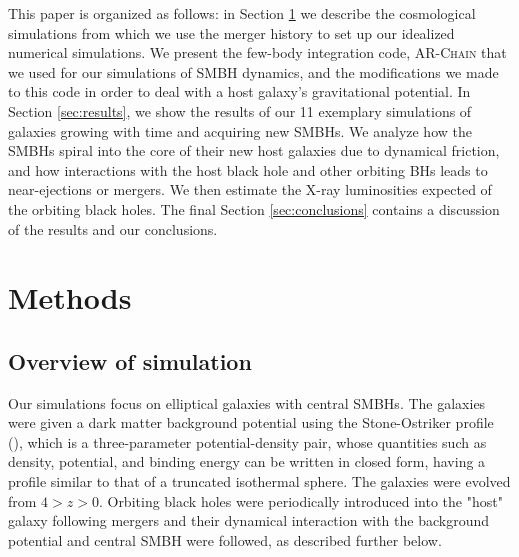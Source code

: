 \documentclass[english, backref,breaklinks,colorlinks,citecolor=blue, usenatbib]{mnras}
\begin{document}
This paper is organized as follows: in Section \ref{sec:methods} we describe the cosmological simulations from which we use the merger history to set up our idealized numerical simulations. We present the few-body integration code, \textsc{AR-Chain} that we used for our simulations of SMBH dynamics, and the modifications we made to this code in order to deal with a host galaxy's gravitational potential. In Section \ref{sec:results}, we show the results of our 11 exemplary simulations of galaxies growing with time and acquiring new SMBHs. We analyze how the SMBHs spiral into the core of their new host galaxies due to dynamical friction, and how interactions with the host black hole and other orbiting BHs leads to near-ejections or mergers. We then estimate the X-ray luminosities expected of the orbiting black holes.  The final Section \ref{sec:conclusions} contains a discussion of the results and our conclusions.


\section{Methods}\label{sec:methods}

\subsection{Overview of simulation}
Our simulations focus on elliptical galaxies with central SMBHs. The galaxies were given a dark matter background potential using the Stone-Ostriker profile (\citet{2015ApJ...806L..28S}), which is a three-parameter potential-density pair, whose quantities such as density, potential, and binding energy can be written in closed form, having a profile similar to that of a truncated isothermal sphere.  The galaxies were evolved from $4 > z > 0$.  Orbiting black holes were periodically introduced into the "host" galaxy following mergers and their dynamical interaction with the background potential and central SMBH were followed, as described further below.
\end{document}
